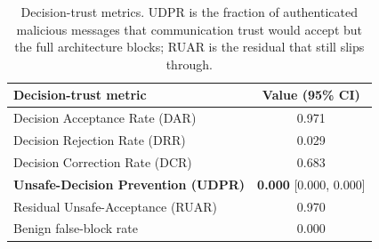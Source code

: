 \begin{table}[t]
\centering
\caption{Decision-trust metrics. UDPR is the fraction of authenticated malicious messages that communication trust would accept but the full architecture blocks; RUAR is the residual that still slips through.}
\label{tab:decisiontrust}
\begin{tabular}{lc}
\toprule
Decision-trust metric & Value (95\% CI) \\
\midrule
Decision Acceptance Rate (DAR) & 0.971 \\
Decision Rejection Rate (DRR) & 0.029 \\
Decision Correction Rate (DCR) & 0.683 \\
\textbf{Unsafe-Decision Prevention (UDPR)} & \textbf{0.000} [0.000, 0.000] \\
Residual Unsafe-Acceptance (RUAR) & 0.970 \\
Benign false-block rate & 0.000 \\
\bottomrule
\end{tabular}
\end{table}
